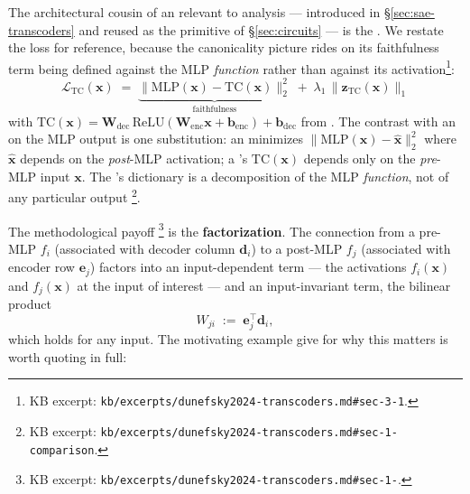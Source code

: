 The architectural cousin of an  relevant to  analysis ---
introduced in \S\ref{sec:sae-transcoders} and reused as the primitive
of \S\ref{sec:circuits} --- is the \emph{}
\citep{dunefsky2024-transcoders}. We restate the loss for reference,
because the canonicality picture rides on its faithfulness term being
defined against the MLP \emph{function} rather than against its
activation\footnote{KB excerpt:
\texttt{kb/excerpts/dunefsky2024-transcoders.md\#sec-3-1}.}:
\begin{equation}
  \mathcal{L}_{\text{TC}}(\mathbf{x})
  \;=\;
  \underbrace{\|\mathrm{MLP}(\mathbf{x}) - \mathrm{TC}(\mathbf{x})\|_2^2}_{\text{faithfulness}}
  \;+\;
  \lambda_1\,\|\mathbf{z}_{\text{TC}}(\mathbf{x})\|_1
  \label{eq:transcoder-loss-canonical}
\end{equation}
with $\mathrm{TC}(\mathbf{x}) = \mathbf{W}_\text{dec}\,\mathrm{ReLU}(\mathbf{W}_\text{enc}\mathbf{x} + \mathbf{b}_\text{enc}) + \mathbf{b}_\text{dec}$
from \citet[\S 3.1, Eq.~3--5]{dunefsky2024-transcoders}. The
contrast with an  on the MLP output is one substitution: an 
minimizes $\|\mathrm{MLP}(\mathbf{x}) - \hat{\mathbf{x}}\|_2^2$ where
$\hat{\mathbf{x}}$ depends on the \emph{post}-MLP activation; a
's $\mathrm{TC}(\mathbf{x})$ depends only on the
\emph{pre}-MLP input $\mathbf{x}$. The 's  dictionary
is a decomposition of the MLP \emph{function}, not of any particular
output \citep[\S 1]{dunefsky2024-transcoders}\footnote{KB excerpt:
\texttt{kb/excerpts/dunefsky2024-transcoders.md\#sec-1-comparison}.}.

The methodological payoff
\citep[\S 1]{dunefsky2024-transcoders}\footnote{KB excerpt:
\texttt{kb/excerpts/dunefsky2024-transcoders.md\#sec-1-}.}
is the \textbf{ factorization}. The connection from a
pre-MLP  $f_i$ (associated with decoder column $\mathbf{d}_i$)
to a post-MLP   $f_j$ (associated with encoder row
$\mathbf{e}_j$) factors into an input-dependent term --- the
activations $f_i(\mathbf{x})$ and $f_j(\mathbf{x})$ at the input of
interest --- and an input-invariant term, the bilinear product
\begin{equation}
  W_{j i} \;:=\; \mathbf{e}_j^\top \mathbf{d}_i,
  \label{eq:transcoder-bilinear}
\end{equation}
which holds for any input. The motivating example
\citet[\S 1]{dunefsky2024-transcoders} give for why this matters is
worth quoting in full:

